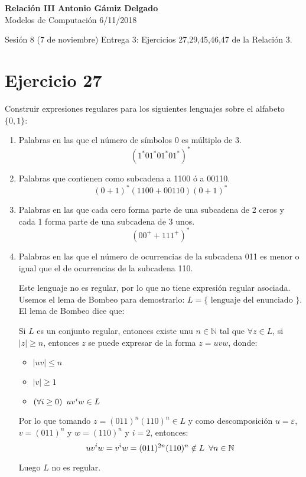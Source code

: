 \documentclass[a4paper, 11pt]{article}
\begin{document}
\noindent
\large\textbf{Relación III} \hfill \textbf{Antonio Gámiz Delgado} \\
\normalsize Modelos de Computación \hfill 6/11/2018

Sesión 8 (7 de noviembre) Entrega 3: Ejercicios 27,29,45,46,47 de la Relación 3.

\section*{Ejercicio 27}
Construir expresiones regulares para los siguientes lenguajes sobre el alfabeto $\{0,1\}$:
\begin{enumerate}
\item Palabras en las que el número de símbolos 0 es múltiplo de 3.
\[
(1^*01^*01^*01^*)^*
\]
\item Palabras que contienen como subcadena a 1100 ó a 00110.
\[
(0+1)^*(1100+00110)(0+1)^*
\]
\item Palabras en las que cada cero forma parte de una subcadena de 2 ceros y cada 1 forma parte de una subcadena de 3 unos.
\[
(00^++111^+)^*
\]
\item Palabras en las que el número de ocurrencias de la subcadena 011 es menor o igual que el de ocurrencias de la subcadena 110.

Este lenguaje no es regular, por lo que no tiene expresión regular asociada. Usemos el lema de Bombeo para demostrarlo: $L=\{\text{ lenguaje del enunciado }\}$.
El lema de Bombeo dice que:

Si $L$ es un conjunto regular, entonces existe unu $n\in\mathbb{N}$ tal que $\forall z \in L$, si $|z|\geq n$, entonces $z$ se puede expresar de la forma $z=uvw$, donde:
\begin{itemize}
\item $|uv|\leq n$
\item $|v|\geq 1$
\item $(\forall i \geq 0) \enskip uv^iw \in L$
\end{itemize}

Por lo que tomando $z = (011)^n(110)^n\in L$ y como descomposición $u=\varepsilon$, $v=(011)^n$ y $w=(110)^n$ y $i=2$, entonces:
\[
uv^iw=v^iw=(011)^{2n}(110)^n\notin L \enskip \forall n \in \mathbb{N}
\]

Luego $L$ no es regular.

\end{enumerate}
\end{document}
